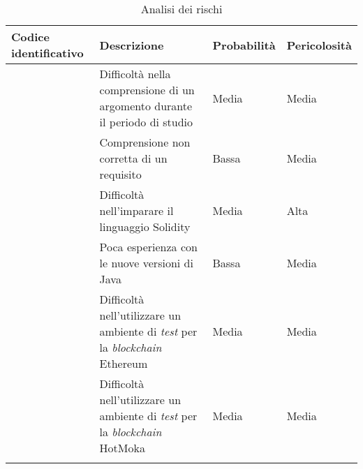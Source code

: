 \begin{longtabu}{|X[1,c]|X[2,c]|X[0.8,c,m]|X[0.8,c,m]|}

  \hline

  \textbf{Codice identificativo} & \textbf{Descrizione} & \textbf{Probabilità} & \textbf{Pericolosità} \\

  \hline

   \label{risk:non-comprensione-argomento} & Difficoltà nella comprensione di un argomento durante il periodo di studio & Media & Media \\

  \hline

   \label{risk:non-comprensione-requisito} & Comprensione non corretta di un requisito & Bassa & Media \\

  \hline

   \label{risk:solidity} & Difficoltà nell'imparare il linguaggio Solidity & Media & Alta \\

  \hline

   \label{risk:java} & Poca esperienza con le nuove versioni di Java & Bassa & Media \\

  \hline

   \label{risk:ethereum-test} & Difficoltà nell'utilizzare un ambiente di \textit{test} per la \textit{blockchain} Ethereum & Media & Media \\

  \hline

   \label{risk:hotmoka-test} & Difficoltà nell'utilizzare un ambiente di \textit{test} per la \textit{blockchain} HotMoka & Media & Media \\

  \hline

  \caption{Analisi dei rischi}
\end{longtabu}

